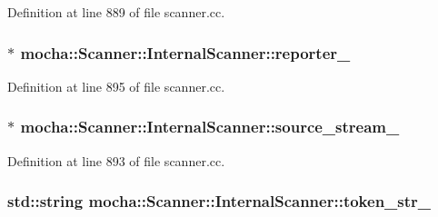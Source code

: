 Definition at line 889 of file scanner.cc.

\hypertarget{classmocha_1_1_scanner_1_1_internal_scanner_a0c242f839db4a29652540b262986f048}{
\subsubsection[{reporter\_\-}]{$\ast$ {\bf mocha::Scanner::InternalScanner::reporter\_\-}}}
\label{classmocha_1_1_scanner_1_1_internal_scanner_a0c242f839db4a29652540b262986f048}


Definition at line 895 of file scanner.cc.

\hypertarget{classmocha_1_1_scanner_1_1_internal_scanner_a73ee193d140adb5dc6b16b636b70b31b}{
\subsubsection[{source\_\-stream\_\-}]{$\ast$ {\bf mocha::Scanner::InternalScanner::source\_\-stream\_\-}}}
\label{classmocha_1_1_scanner_1_1_internal_scanner_a73ee193d140adb5dc6b16b636b70b31b}


Definition at line 893 of file scanner.cc.

\hypertarget{classmocha_1_1_scanner_1_1_internal_scanner_a2d7ca3e8ec12f70efe038c36461dbb98}{
\subsubsection[{token\_\-str\_\-}]{\setlength{\rightskip}{0pt plus 5cm}std::string {\bf mocha::Scanner::InternalScanner::token\_\-str\_\-}}}
\label{classmocha_1_1_scanner_1_1_internal_scanner_a2d7ca3e8ec12f70efe038c36461dbb98}



